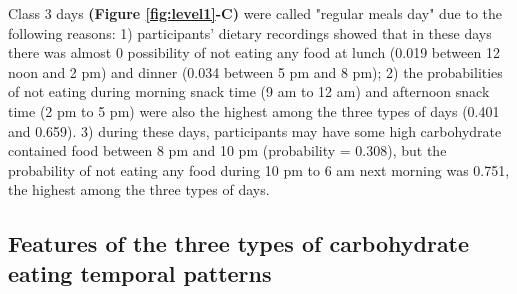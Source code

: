 Class 3 days \textbf{(Figure \ref{fig:level1}-C)} were called "regular meals day" due to the following reasons: 1) participants' dietary recordings showed that in these days there was almost 0 possibility of not eating any food at lunch (0.019 between 12 noon and 2 pm) and dinner (0.034 between 5 pm and 8 pm); 2) the probabilities of not eating during morning snack time (9 am to 12 am) and afternoon snack time (2 pm to 5 pm) were also the highest among the three types of days (0.401 and 0.659). 3) during these days, participants may have some high carbohydrate contained food between 8 pm and 10 pm (probability = 0.308), but the probability of not eating any food during 10 pm to 6 am next morning was 0.751, the highest among the three types of days. \vspace{-0.5cm}


\subsection{Features of the three types of carbohydrate eating temporal patterns}


